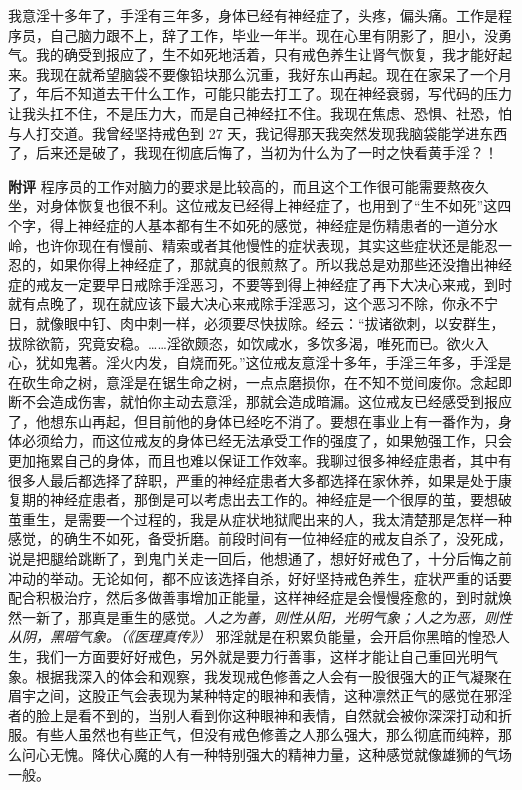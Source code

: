 \begin{case}
    我意淫十多年了，手淫有三年多，身体已经有神经症了，头疼，偏头痛。工作是程序员，自己脑力跟不上，辞了工作，毕业一年半。现在心里有阴影了，胆小，没勇气。我的确受到报应了，生不如死地活着，只有戒色养生让肾气恢复，我才能好起来。我现在就希望脑袋不要像铅块那么沉重，我好东山再起。现在在家呆了一个月了，年后不知道去干什么工作，可能只能去打工了。现在神经衰弱，写代码的压力让我头扛不住，不是压力大，而是自己神经扛不住。我现在焦虑、恐惧、社恐，怕与人打交道。我曾经坚持戒色到 27 天，我记得那天我突然发现我脑袋能学进东西了，后来还是破了，我现在彻底后悔了，当初为什么为了一时之快看黄手淫？！

    \textbf{附评} 程序员的工作对脑力的要求是比较高的，而且这个工作很可能需要熬夜久坐，对身体恢复也很不利。这位戒友已经得上神经症了，也用到了“生不如死”这四个字，得上神经症的人基本都有生不如死的感觉，神经症是伤精患者的一道分水岭，也许你现在有慢前、精索或者其他慢性的症状表现，其实这些症状还是能忍一忍的，如果你得上神经症了，那就真的很煎熬了。所以我总是劝那些还没撸出神经症的戒友一定要早日戒除手淫恶习，不要等到得上神经症了再下大决心来戒，到时就有点晚了，现在就应该下最大决心来戒除手淫恶习，这个恶习不除，你永不宁日，就像眼中钉、肉中刺一样，必须要尽快拔除。经云：“拔诸欲刺，以安群生，拔除欲箭，究竟安稳。……淫欲颇恣，如饮咸水，多饮多渴，唯死而已。欲火入心，犹如鬼著。淫火内发，自烧而死。”这位戒友意淫十多年，手淫三年多，手淫是在砍生命之树，意淫是在锯生命之树，一点点磨损你，在不知不觉间废你。念起即断不会造成伤害，就怕你主动去意淫，那就会造成暗漏。这位戒友已经感受到报应了，他想东山再起，但目前他的身体已经吃不消了。要想在事业上有一番作为，身体必须给力，而这位戒友的身体已经无法承受工作的强度了，如果勉强工作，只会更加拖累自己的身体，而且也难以保证工作效率。我聊过很多神经症患者，其中有很多人最后都选择了辞职，严重的神经症患者大多都选择在家休养，如果是处于康复期的神经症患者，那倒是可以考虑出去工作的。神经症是一个很厚的茧，要想破茧重生，是需要一个过程的，我是从症状地狱爬出来的人，我太清楚那是怎样一种感觉，的确生不如死，备受折磨。前段时间有一位神经症的戒友自杀了，没死成，说是把腿给跳断了，到鬼门关走一回后，他想通了，想好好戒色了，十分后悔之前冲动的举动。无论如何，都不应该选择自杀，好好坚持戒色养生，症状严重的话要配合积极治疗，然后多做善事增加正能量，这样神经症是会慢慢痊愈的，到时就焕然一新了，那真是重生的感觉。\textit{人之为善，则性从阳，光明气象；人之为恶，则性从阴，黑暗气象。（《医理真传》）} 邪淫就是在积累负能量，会开启你黑暗的惶恐人生，我们一方面要好好戒色，另外就是要力行善事，这样才能让自己重回光明气象。根据我深入的体会和观察，我发现戒色修善之人会有一股很强大的正气凝聚在眉宇之间，这股正气会表现为某种特定的眼神和表情，这种凛然正气的感觉在邪淫者的脸上是看不到的，当别人看到你这种眼神和表情，自然就会被你深深打动和折服。有些人虽然也有些正气，但没有戒色修善之人那么强大，那么彻底而纯粹，那么问心无愧。降伏心魔的人有一种特别强大的精神力量，这种感觉就像雄狮的气场一般。
\end{case}


